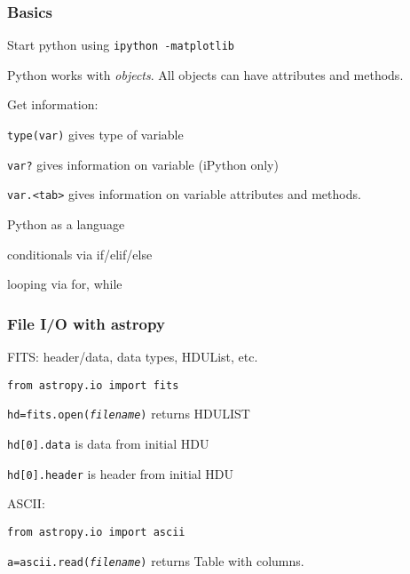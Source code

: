 \documentclass[12pt]{article}
\begin{document}
\subsubsection{Basics}
\begin{itemize*}
    \item Start python using \texttt{ipython -matplotlib}
    \item Python works with \emph{objects}. All objects can have
        attributes and methods.
    \item Get information:
        \begin{itemize*}
            \item \texttt{type(var)} gives type of variable
            \item \texttt{var?} gives information on variable (iPython
                only)
            \item \texttt{var.<tab>} gives information on variable
                attributes and methods.
        \end{itemize*}
    \item Python as a language
        \begin{itemize*}
            \item conditionals via if/elif/else
            \item looping via for, while
        \end{itemize*}
\end{itemize*}

\subsubsection{File I/O with astropy}
\begin{itemize*}
    \item FITS: header/data, data types, HDUList, etc.
        \begin{itemize*}
            \item \texttt{from astropy.io import fits}
            \item \texttt{hd=fits.open(\emph{filename})}
                returns HDULIST
            \item \texttt{hd[0].data} is data from initial HDU
            \item \texttt{hd[0].header} is header from initial HDU
        \end{itemize*}
    \item ASCII:
        \begin{itemize*}
            \item \texttt{from astropy.io import ascii}
            \item \texttt{a=ascii.read(\emph{filename})} returns Table with columns.
        \end{itemize*}
\end{itemize*}
\end{document}
